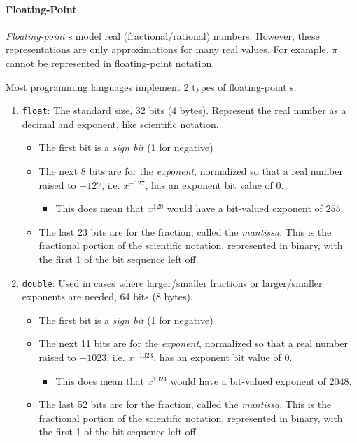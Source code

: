 \paragraph{Floating-Point}\label{par:Floating_Point_Numeric_Primitive_Data_Type}
\begin{definition}\label{def:Floating_Point}
  \emph{Floating-point} s model real (fractional/rational) numbers.
  However, these representations are only approximations for many real values.
  For example, $\pi$ cannot be represented in floating-point notation.

  Most programming languages implement 2 types of floating-point s.
  \begin{enumerate}[noitemsep]
  \item \texttt{float}: The standard size, 32 bits (4 bytes). Represent the real number as a decimal and exponent, like scientific notation.
    \begin{itemize}[noitemsep]
    \item The first bit is a \emph{sign bit} (1 for negative)
    \item The next 8 bits are for the \emph{exponent}, normalized so that a real number raised to $-127$, i.e. $x^{-127}$, has an exponent bit value of 0.
      \begin{itemize}[noitemsep]
      \item This does mean that $x^{128}$ would have a bit-valued exponent of $255$.
      \end{itemize}
    \item The last 23 bits are for the fraction, called the \emph{mantissa}. This is the fractional portion of the scientific notation, represented in binary, with the first 1 of the bit sequence left off.
    \end{itemize}
  \item \texttt{double}: Used in cases where larger/smaller fractions or larger/smaller exponents are needed, 64 bits (8 bytes).
    \begin{itemize}[noitemsep]
    \item The first bit is a \emph{sign bit} (1 for negative)
    \item The next 11 bits are for the \emph{exponent}, normalized so that a real number raised to $-1023$, i.e. $x^{-1023}$, has an exponent bit value of 0.
      \begin{itemize}[noitemsep]
      \item This does mean that $x^{1024}$ would have a bit-valued exponent of $2048$.
      \end{itemize}
    \item The last 52 bits are for the fraction, called the \emph{mantissa}. This is the fractional portion of the scientific notation, represented in binary, with the first 1 of the bit sequence left off.
    \end{itemize}
  \end{enumerate}
\end{definition}

